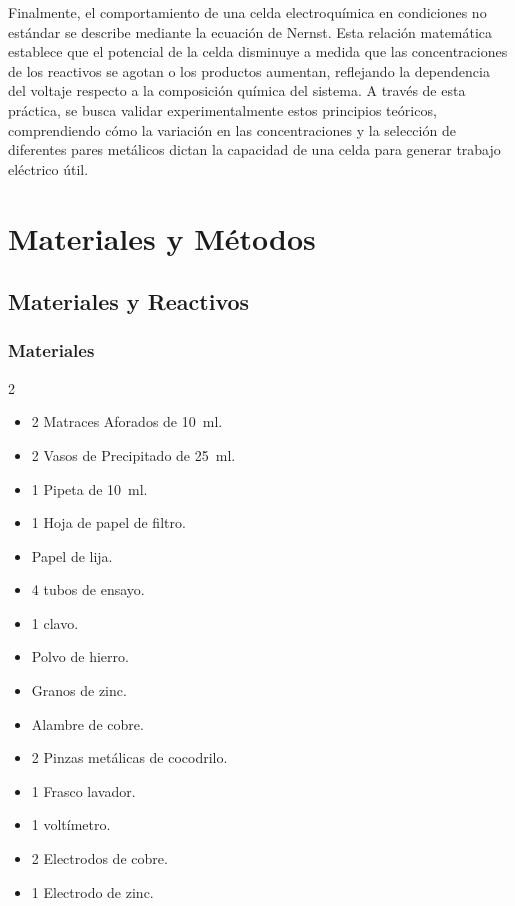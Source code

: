 \documentclass[12pt]{article}
\begin{document}
Finalmente, el comportamiento de una celda electroquímica en condiciones no
estándar se describe mediante la ecuación de Nernst. Esta relación matemática
establece que el potencial de la celda disminuye a medida que las
concentraciones de los reactivos se agotan o los productos aumentan, reflejando
la dependencia del voltaje respecto a la composición química del sistema. A
través de esta práctica, se busca validar experimentalmente estos principios
teóricos, comprendiendo cómo la variación en las concentraciones y la selección
de diferentes pares metálicos dictan la capacidad de una celda para generar
trabajo eléctrico útil.

\section{Materiales y Métodos}

\subsection{Materiales y Reactivos}

\subsubsection*{Materiales}

\begin{multicols}{2}
\begin{itemize}[leftmargin=0.5cm, nosep]
    \item 2 Matraces Aforados de 10~ml.
    \item 2 Vasos de Precipitado de 25~ml.
    \item 1 Pipeta de 10~ml.
    \item 1 Hoja de papel de filtro.
    \item Papel de lija.
    \item 4 tubos de ensayo.
    \item 1 clavo.
    \item Polvo de hierro.
    \item Granos de zinc.
    \item Alambre de cobre.
    \item 2 Pinzas metálicas de cocodrilo.
    \item 1 Frasco lavador.
    \item 1 voltímetro.
    \item 2 Electrodos de cobre.
    \item 1 Electrodo de zinc.
\end{itemize}
\end{multicols}
\end{document}

